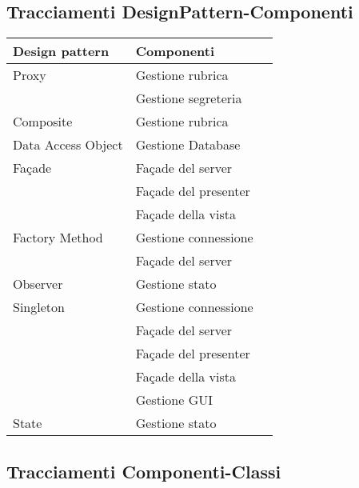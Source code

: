 \subsection{Tracciamenti DesignPattern-Componenti}

\begin{center}
\begin{longtable}{lp{}l}
\toprule Design pattern & Componenti\\
\midrule
Proxy & Gestione rubrica \\
 & Gestione segreteria \\
Composite & Gestione rubrica \\
Data Access Object & Gestione Database \\
Façade & Façade del server \\
 & Façade del presenter \\
 & Façade della vista \\
Factory Method & Gestione connessione \\
 & Façade del server \\
Observer & Gestione stato \\
Singleton & Gestione connessione \\
 & Façade del server \\
 & Façade del presenter \\
 & Façade della vista \\
 & Gestione GUI \\
State & Gestione stato \\
\bottomrule
\end{longtable}
\end{center}
\subsection{Tracciamenti Componenti-Classi}


